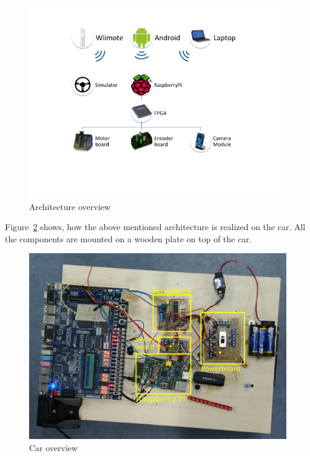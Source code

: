 \documentclass[a4paper
               ,10pt
               ,DIV=10 %
               ,BCOR=0.3cm
               ,pagesize %
               ,headings=small
               ,bibtotoc
               ]
               {scrartcl}
\begin{document}
\begin{figure}[H]
\begin{center}
\includegraphics[width=\linewidth]{pic/architecture}
\caption{Architecture overview}
\label{figarchitecture}
\end{center}
\end{figure}

Figure~\ref{figcaroverview} shows, how the above mentioned architecture is realized on the car. All the components are mounted on a wooden plate on top of the car.
\begin{figure}[H]
\begin{center}
\includegraphics[width=\linewidth]{pic/overview}
\caption{Car overview}
\label{figcaroverview}
\end{center}
\end{figure}
\end{document}
